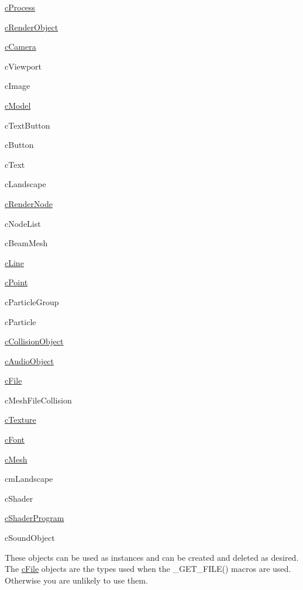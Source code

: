 \begin{DoxyItemize}
\item \hyperlink{classc_process}{cProcess}
\item \hyperlink{classc_render_object}{cRenderObject}
\item \hyperlink{classc_camera}{cCamera}
\item cViewport
\begin{DoxyItemize}
\item cImage
\item \hyperlink{classc_model}{cModel}
\item cTextButton
\item cButton
\item cText
\item cLandscape
\item \hyperlink{classc_render_node}{cRenderNode}
\item cNodeList
\item cBeamMesh
\item \hyperlink{classc_line}{cLine}
\item \hyperlink{classc_point}{cPoint}
\item cParticleGroup
\item cParticle
\end{DoxyItemize}
\item \hyperlink{classc_collision_object}{cCollisionObject}
\item \hyperlink{classc_audio_object}{cAudioObject}
\item \hyperlink{classc_file}{cFile}
\begin{DoxyItemize}
\item cMeshFileCollision
\item \hyperlink{classc_texture}{cTexture}
\item \hyperlink{classc_font}{cFont}
\item \hyperlink{classc_mesh}{cMesh}
\item cmLandscape
\item cShader
\item \hyperlink{classc_shader_program}{cShaderProgram}
\item cSoundObject
\end{DoxyItemize}
\end{DoxyItemize}These objects can be used as instances and can be created and deleted as desired. The \hyperlink{classc_file}{cFile} objects are the types used when the \_\-GET\_\-FILE() macros are used. Otherwise you are unlikely to use them.
